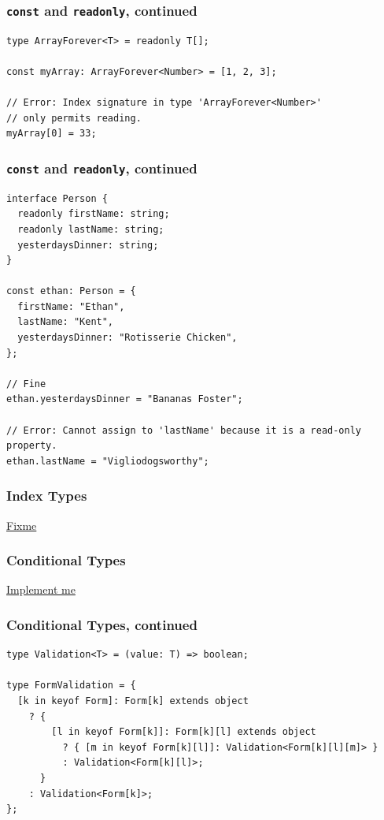 \documentclass[aspectratio=169]{beamer}
\begin{document}
\begin{frame}[fragile]
  \frametitle{\texttt{const} and \texttt{readonly}, continued}

  \begin{verbatim}
type ArrayForever<T> = readonly T[];

const myArray: ArrayForever<Number> = [1, 2, 3];

// Error: Index signature in type 'ArrayForever<Number>'
// only permits reading.
myArray[0] = 33;

  \end{verbatim}
\end{frame}

\begin{frame}[fragile]
  \frametitle{\texttt{const} and \texttt{readonly}, continued}
  \small

  \begin{verbatim}
interface Person {
  readonly firstName: string;
  readonly lastName: string;
  yesterdaysDinner: string;
}

const ethan: Person = {
  firstName: "Ethan",
  lastName: "Kent",
  yesterdaysDinner: "Rotisserie Chicken",
};

// Fine
ethan.yesterdaysDinner = "Bananas Foster";

// Error: Cannot assign to 'lastName' because it is a read-only property.
ethan.lastName = "Vigliodogsworthy";

  \end{verbatim}
\end{frame}

\begin{frame}
  \frametitle{Index Types}

  \href{https://bit.ly/3dVMzgx}{Fixme}
\end{frame}

\begin{frame}[fragile]
  \frametitle{Conditional Types}

  \href{https://bit.ly/3dXnfGX}{Implement me}
\end{frame}

\begin{frame}[fragile]
  \frametitle{Conditional Types, continued}

  \begin{verbatim}
type Validation<T> = (value: T) => boolean;

type FormValidation = {
  [k in keyof Form]: Form[k] extends object
    ? {
        [l in keyof Form[k]]: Form[k][l] extends object
          ? { [m in keyof Form[k][l]]: Validation<Form[k][l][m]> }
          : Validation<Form[k][l]>;
      }
    : Validation<Form[k]>;
};
\end{verbatim}
\end{frame}
\end{document}
